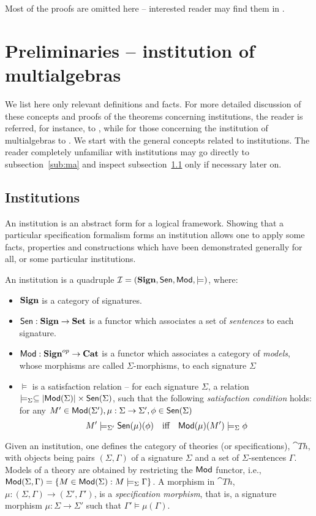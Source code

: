 Most of the proofs are omitted here -- interested reader may find them in \cite{TRparam}.

\section{Preliminaries -- institution of multialgebras}\label{se:ma}
We list here only relevant definitions and facts. For more detailed
discussion of these concepts and proofs of the theorems concerning
institutions, the reader is referred, for instance, to
\cite{stateinst}, while for those
concerning the institution of multialgebras to \cite{MAinst}.
We start with the general concepts related to institutions.
The reader completely unfamiliar with  institutions may
go directly to subsection~\ref{sub:ma} and inspect subsection~\ref{sub:inst}
only if necessary later on.


\subsection{Institutions}\label{sub:inst}
An institution \cite{inst,stateinst} is an abstract form for a logical framework. Showing that a particular
specification formalism forms an institution allows one to apply some 
facts, properties and constructions which have been demonstrated generally for all, or some
particular institutions.
%
\begin{definition}\label{de:inst}
An institution is a quadruple ${\mathcal{I}} = ({\bf Sign},{\sf {Sen}},{\sf {Mod}},\models)$, where:
\begin{itemize}\MyLPar
\item ${\bf Sign}$ is a category of signatures.  
\item ${\sf {Sen}}: {\bf Sign} \to {\bf Set}$ is a functor which associates a set of {\it sentences} to each signature.
\item ${\sf {Mod}}:{\bf Sign}^{op} \to {\bf Cat}$ is a functor which associates a
category of {\it models}, whose morphisms are called $\Sigma$-morphisms, to
each signature $\Sigma$
\item $\models$ is a satisfaction relation -- for each signature $\Sigma$, a relation
 $\models_{\Sigma} \subseteq |{\sf {Mod}}(\Sigma)| \times
{\sf {Sen}}(\Sigma)$, such that the following {\it satisfaction condition} holds:
for any $M' \in {\sf {Mod}}(\Sigma'), \mu: \Sigma \to \Sigma' , \phi \in {\sf {Sen}}(\Sigma)$
  \[ M' \models_{\Sigma'} \Sen(\mu)(\phi)\ \  \mbox{ iff }\ \ \Mod(\mu)(M') \models_{\Sigma} \phi\]
	\end{itemize}
\end{definition}
%
Given an institution, one defines the category of theories (or
specifications), $\cat{Th}$, with objects being pairs $(\Sigma,\Gamma)$ of a
signature $\Sigma$ and a set of $\Sigma$-sentences $\Gamma$. Models of a
theory are obtained by restricting the ${\sf {Mod}}$ functor, i.e.,
${\sf {Mod}}(\Sigma,\Gamma)=\{M\in{\sf {Mod}}(\Sigma):M\models_\Sigma\Gamma\}$. A morphism
in $\cat{Th}$, $\mu:(\Sigma,\Gamma)\to(\Sigma',\Gamma')$, 
is a {\em specification morphism}, that is, a signature morphism
$\mu:\Sigma\to\Sigma'$ such that $\Gamma'\models\mu(\Gamma)$. 

